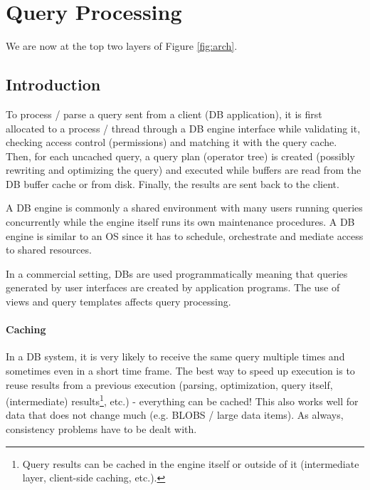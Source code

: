 \section{Query Processing}

We are now at the top two layers of Figure \ref{fig:arch}.


\subsection{Introduction}

To process / parse a query sent from a client (DB application), it is first allocated to a process / thread through a DB engine interface while validating it, checking access control (permissions) and matching it with the query cache. Then, for each uncached query, a query plan (operator tree) is created (possibly rewriting and optimizing the query) and executed while buffers are read from the DB buffer cache or from disk. Finally, the results are sent back to the client.


A DB engine is commonly a shared environment with many users running queries concurrently while the engine itself runs its own maintenance procedures. A DB engine is similar to an OS since it has to schedule, orchestrate and mediate access to shared resources.

In a commercial setting, DBs are used programmatically meaning that queries generated by user interfaces are created by application programs. The use of views and query templates affects query processing.


\paragraph{Caching}
In a DB system, it is very likely to receive the same query multiple times and sometimes even in a short time frame. The best way to speed up execution is to reuse results from a previous execution (parsing, optimization, query itself, (intermediate) results\footnote{Query results can be cached in the engine itself or outside of it (intermediate layer, client-side caching, etc.).}, etc.) - everything can be cached! This also works well for data that does not change much (e.g. BLOBS / large data items). As always, consistency problems have to be dealt with.


